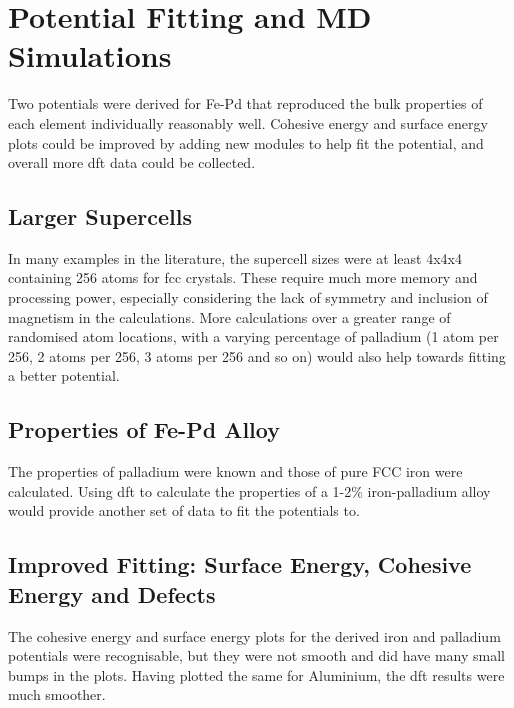 \section{Potential Fitting and MD Simulations}

Two potentials were derived for Fe-Pd that reproduced the bulk properties of each element individually reasonably well.  Cohesive energy and surface energy plots could be improved by adding new modules to help fit the potential, and overall more \acrshort{dft} data could be collected.

\subsection{Larger Supercells}

In many examples in the literature, the supercell sizes were at least 4x4x4 containing 256 atoms for \acrshort{fcc} crystals.  These require much more memory and processing power, especially considering the lack of symmetry and inclusion of magnetism in the calculations.  More calculations over a greater range of randomised atom locations, with a varying percentage of palladium (1 atom per 256, 2 atoms per 256, 3 atoms per 256 and so on) would also help towards fitting a better potential.

\subsection{Properties of Fe-Pd Alloy}

The properties of palladium were known and those of pure FCC iron were calculated.  Using \acrshort{dft} to calculate the properties of a 1-2\% iron-palladium alloy would provide another set of data to fit the potentials to.


\FloatBarrier
\subsection{Improved Fitting: Surface Energy, Cohesive Energy and Defects}

The cohesive energy and surface energy plots for the derived iron and palladium potentials were recognisable, but they were not smooth and did have many small bumps in the plots.  Having plotted the same for Aluminium, the \acrshort{dft} results were much smoother.  

